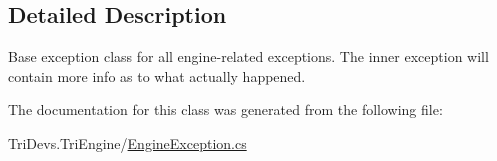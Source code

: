 \subsection{Detailed Description}
Base exception class for all engine-\/related exceptions. The inner exception will contain more info as to what actually happened. 



The documentation for this class was generated from the following file\-:\begin{DoxyCompactItemize}
\item 
Tri\-Devs.\-Tri\-Engine/\hyperlink{_engine_exception_8cs}{Engine\-Exception.\-cs}\end{DoxyCompactItemize}
